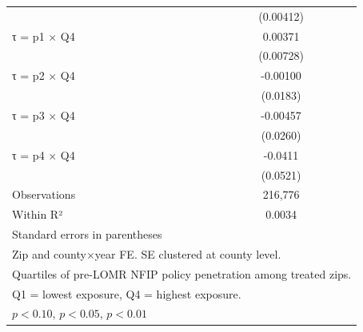 \begin{table}[htbp]
\begin{tabular}{l*{1}{c}}
                    &   (0.00412)         \\
[1em]
τ = p1 × Q4         &     0.00371         \\
                    &   (0.00728)         \\
[1em]
τ = p2 × Q4         &    -0.00100         \\
                    &    (0.0183)         \\
[1em]
τ = p3 × Q4         &    -0.00457         \\
                    &    (0.0260)         \\
[1em]
τ = p4 × Q4         &     -0.0411         \\
                    &    (0.0521)         \\
\hline
Observations        &     216,776         \\
Within R²           &      0.0034         \\
\hline\hline
\multicolumn{2}{l}{\footnotesize Standard errors in parentheses}\\
\multicolumn{2}{l}{\footnotesize Zip and county×year FE. SE clustered at county level.}\\
\multicolumn{2}{l}{\footnotesize Quartiles of pre-LOMR NFIP policy penetration among treated zips.}\\
\multicolumn{2}{l}{\footnotesize Q1 = lowest exposure, Q4 = highest exposure.}\\
\multicolumn{2}{l}{\footnotesize \sym{*} \(p<0.10\), \sym{**} \(p<0.05\), \sym{***} \(p<0.01\)}\\
\end{tabular}
\end{table}
